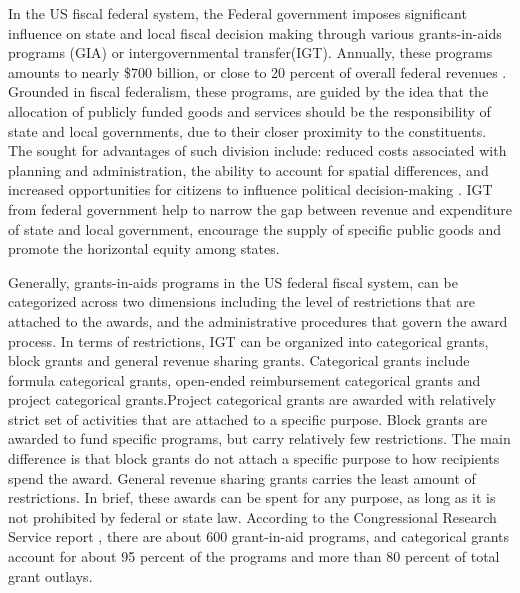 In the US fiscal federal system, the Federal government imposes significant influence on state and local fiscal decision making through various grants-in-aids programs (GIA) or intergovernmental transfer(IGT). Annually, these programs amounts to nearly \$700 billion, or close to 20 percent of overall federal revenues \cite{dilger2015federal}. Grounded in fiscal federalism, these programs, are guided by the idea that the allocation of publicly funded goods and services should be the responsibility of state and local governments, due to their closer proximity to the constituents. The sought for advantages of such division include: reduced costs associated with planning and administration, the ability to account for spatial differences, and increased opportunities for citizens to influence political decision-making \cite{musgrave1997devolution}. IGT from federal government help to narrow the gap between revenue and expenditure of state and local government, encourage the supply of specific public goods and promote the horizontal equity among states.

Generally, grants-in-aids programs in the US federal fiscal system, can be categorized across two dimensions including the level of restrictions that are attached to the awards, and the administrative procedures that govern the award process. In terms of restrictions, IGT can be organized into categorical grants, block grants and general revenue sharing grants. Categorical grants include formula categorical grants, open-ended reimbursement categorical grants and project categorical grants.Project categorical grants are awarded with relatively strict set of activities that are attached to a specific purpose. Block grants are awarded to fund specific programs, but carry relatively few restrictions. The main difference is that block grants do not attach a specific purpose to how recipients spend the award. General revenue sharing grants carries the least amount of restrictions. In brief, these awards can be spent for any purpose, as long as it is not prohibited by federal or state law.  According to the Congressional Research Service report \cite{dilger2015federal}, there are about 600 grant-in-aid programs, and categorical grants account for about 95 percent of the programs and more than 80 percent of total grant outlays.

